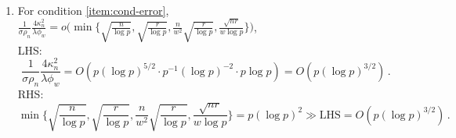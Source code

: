 \documentclass[11pt]{article}
\begin{document}
\begin{enumerate}
\[
\min\left\{ \frac{n}{w^2}\sqrt{\frac{r}{\log p}}, \frac{\sqrt{nr}}{w\log p}\right\}=p^{3/2}(\log p)^{3}\gg \mbox{LHS}=O(p^{3/2}(\log p)^{5/2})\,.
\]
\item For condition \ref{item:cond-error}, $\frac{1}{\sigma\rho_n}\frac{4\kappa_n^2}{\lambda\phi_w} = o\bigg(\min\bigg\{\sqrt{\frac{n}{\log p}},\sqrt{\frac{r}{\log p}},\frac{n}{w^2}\sqrt{\frac{r}{\log p}},\frac{\sqrt{nr}}{w\log p}\bigg\}\bigg)$,\\
LHS:
\[
\frac{1}{\sigma\rho_n}\frac{4\kappa_n^2}{\lambda\phi_w}=O\left(p(\log p)^{5/2}\cdot p^{-1}(\log p)^{-2}\cdot p\log p\right)=O\left( p(\log p)^{3/2}\right)\,.
\]
RHS:
\[
\min\bigg\{\sqrt{\frac{n}{\log p}},\sqrt{\frac{r}{\log p}},\frac{n}{w^2}\sqrt{\frac{r}{\log p}},\frac{\sqrt{nr}}{w\log p}\bigg\} = p(\log p)^2\gg \mbox{LHS}=O\left(p(\log p)^{3/2} \right)\,.
\]
\end{enumerate}
\end{document}
